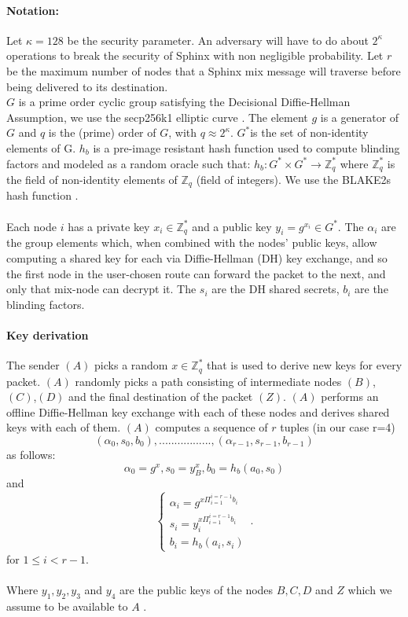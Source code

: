 \paragraph{Notation:}Let $\kappa=128$ be the security parameter. An adversary will have to do about $2^\kappa$ operations to break the security of Sphinx with non negligible probability.
Let $r$ be the maximum number of nodes that a Sphinx mix message will traverse before being delivered to its destination.
\\$G$ is a prime order cyclic group satisfying the Decisional Diffie-Hellman Assumption, we use the secp256k1 elliptic curve \cite{sec2}. The element $g$ is a generator of $G$ and $q$ is the (prime) order of $G$, with $q\approx2^{\kappa}$.
$G^*$is the set of non-identity elements of G. $h_b$ is a pre-image resistant hash function used to compute blinding factors and modeled as a random oracle such that:
$h_b:G^*\times G^*\rightarrow\mathbb{Z}^*_q$ where $\mathbb{Z}^*_q$ is the field of non-identity elements of $\mathbb{Z}_q$ (field of integers). We use the BLAKE2s hash function \cite{blake2}.
    \\~\\Each node $i$ has a private key $x_{i}\in \mathbb{Z}^*_q$ and a public key $y_{i}=g^{x_{i}}\in G^*$.
    The $\alpha_i$ are the group elements which, when combined with the nodes’ public keys, allow computing a shared key for each via Diffie-Hellman (DH) key exchange, and so the first node in the user-chosen route can forward the packet to the next, and only that mix-node can decrypt it.
The $s_i$ are the DH shared secrets, $b_i$ are the blinding factors.

\paragraph{Key derivation}
The sender $(A)$ picks a random $x\in \mathbb{Z}^*_q$ that is used to derive new keys for every packet.
\newline $(A)$ randomly picks a path consisting of intermediate nodes $(B)$, $(C)$,$(D)$ and the final destination of the packet $(Z)$.
\newline $(A)$ performs an offline Diffie-Hellman key exchange with each of these nodes and derives shared keys with each of them.
\newline $(A)$ computes a sequence of $r$ tuples (in our case r=4)  $$(\alpha_0,s_0,b_0),.................,(\alpha_{r-1},s_{r-1},b_{r-1})$$ as follows:
$$\alpha_0=g^x,s_0=y^x_B,b_0=h_b(a_0,s_0)$$
and
\begin{equation}
    \begin{cases}
        \alpha_i=g^{x\Pi_{i=1}^{i=r-1}b_i}\\
        s_i=y^{x\Pi_{i=1}^{i=r-1}b_i}_i \\
        b_i=h_b(a_i,s_i)
    \end{cases}\,.
    \label{eq:1}
\end{equation}
for $1\le i < r-1$.
\\~\\Where $y_1, y_2,y_3$ and $y_4$ are the public keys of the nodes $B,C, D$ and $Z$  which we assume to be available to $A$ .

